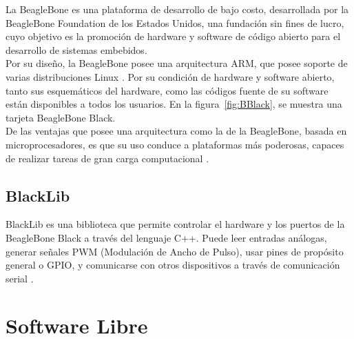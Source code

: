 
La BeagleBone es una plataforma de desarrollo de bajo costo, desarrollada por la BeagleBone Foundation de los Estados Unidos, una fundación sin fines de lucro, cuyo objetivo es la promoción de hardware y software de código abierto para el desarrollo de sistemas embebidos. \\

Por su diseño, la BeagleBone posee una arquitectura ARM, que posee soporte de varias distribuciones Linux \citep{coronado2014desarrollo}. Por su condición de hardware y software abierto, tanto sus esquemáticos del hardware, como las códigos fuente de su software están disponibles a todos los usuarios. En la figura~\ref{fig:BBlack}, se muestra una tarjeta BeagleBone Black.\\

De las ventajas que posee una arquitectura como la de la BeagleBone, basada en microprocesadores, es que su uso conduce a plataformas más poderosas, capaces de realizar tareas de gran carga computacional \citep{coley2013beaglebone}.

\subsection{BlackLib}

BlackLib es una biblioteca que permite controlar el hardware y los puertos de la BeagleBone Black a través del lenguaje C++. Puede leer entradas análogas, generar señales PWM (Modulación de Ancho de Pulso), usar pines de propósito general o GPIO, y comunicarse con otros dispositivos a través de comunicación serial \citep{blacklib}.

\section{Software Libre}



